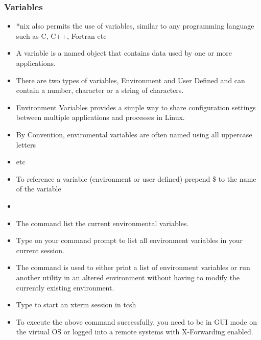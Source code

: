 \documentclass[10pt,t]{beamer}
\begin{document}
\begin{frame}
  \frametitle{Variables}
  \begin{itemize}
    \item *nix also permits the use of variables, similar to any programming language such as C, C++, Fortran etc
    \item A variable is a named object that contains data used by one or more applications. 
    \item There are two types of variables, Environment and User Defined and can contain  a number, character or a string of characters.
    \item Environment Variables provides a simple way to share configuration settings between multiple applications and processes in Linux.
    \item By Convention, enviromental variables are often named using all uppercase letters
    \item[e.g.]  etc
    \item To reference a variable (environment or user defined) prepend \$ to the name of the variable
    \item[e.g.] 
    \framebreak
  \end{itemize}
%
  \begin{itemize}
    \item The command  list the current environmental variables.
    \item[$\mybigstar$] {Type  on your command prompt to list all environment variables in your current session.}
    \item The command  is used to either print a list of environment variables or run another utility in an altered environment without having to modify the currently existing environment.
    \item[$\mybigstar$] {Type  to start an xterm session in tcsh}
    \item[$\vardiamond$] {To execute the above command successfully, you need to be in GUI mode on the virtual OS or logged into a remote systems with X-Forwarding enabled.}
  \end{itemize}
  \framebreak
  \begin{description}

\end{description}
\end{frame}
\end{document}
